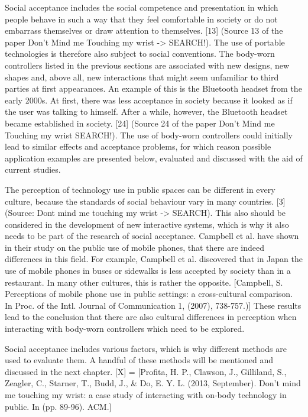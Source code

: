 \documentclass{sigchi}
\begin{document}
Social acceptance includes the social competence and presentation in which people behave in such a way that they feel comfortable in society or do not embarrass themselves or draw attention to themselves. [13] (Source 13 of the paper Don't Mind me Touching my wrist -> SEARCH!). The use of portable technologies is therefore also subject to social conventions. The body-worn controllers listed in the previous sections are associated with new designs, new shapes and, above all, new interactions that might seem unfamiliar to third parties at first appearances.
An example of this is the Bluetooth headset from the early 2000s. At first, there was less acceptance in society because it looked as if the user was talking to himself. After a while, however, the Bluetooth headset became established in society. [24] (Source 24 of the paper Don't Mind me Touching my wrist SEARCH!). The use of body-worn controllers could initially lead to similar effects and acceptance problems, for which reason possible application examples are presented below, evaluated and discussed with the aid of current studies.

The perception of technology use in public spaces can be different in every culture, because the standards of social behaviour vary in many countries. [3] (Source: Dont mind me touching my wrist -> SEARCH). This also should be considered in the development of new interactive systems, which is why it also needs to be part of the research of social acceptance.  Campbell et al. have shown in their study on the public use of mobile phones, that there are indeed differences in this field. For example, Campbell et al. discovered that in Japan the use of mobile phones in buses or sidewalks is less accepted by society than in a restaurant. In many other cultures, this is rather the opposite. [Campbell, S. Perceptions of mobile phone use in public settings: a cross-cultural comparison. In Proc. of the Intl. Journal of Communication 1, (2007), 738-757.)]
These results lead to the conclusion that there are also cultural differences in perception when interacting with body-worn controllers which need to be explored.

Social acceptance includes various factors, which is why different methods are used to evaluate them. A handful of these methods will be mentioned and discussed in the next chapter.
[X] = [Profita, H. P., Clawson, J., Gilliland, S., Zeagler, C., Starner, T., Budd, J., \& Do, E. Y. L.
(2013, September). Don't mind me touching my wrist: a case study of interacting with on-body
technology in public. In
(pp. 89-96). ACM.]
\end{document}
